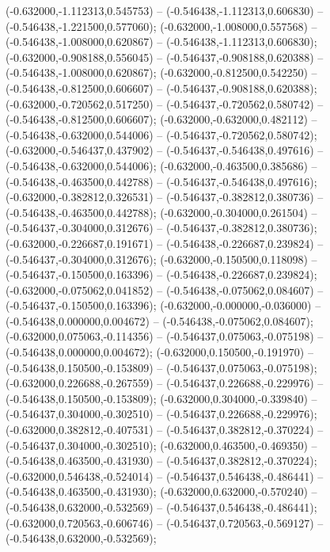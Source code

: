  (-0.632000,-1.112313,0.545753) -- (-0.546438,-1.112313,0.606830) -- (-0.546438,-1.221500,0.577060);
 (-0.632000,-1.008000,0.557568) -- (-0.546438,-1.008000,0.620867) -- (-0.546438,-1.112313,0.606830);
 (-0.632000,-0.908188,0.556045) -- (-0.546437,-0.908188,0.620388) -- (-0.546438,-1.008000,0.620867);
 (-0.632000,-0.812500,0.542250) -- (-0.546438,-0.812500,0.606607) -- (-0.546437,-0.908188,0.620388);
 (-0.632000,-0.720562,0.517250) -- (-0.546437,-0.720562,0.580742) -- (-0.546438,-0.812500,0.606607);
 (-0.632000,-0.632000,0.482112) -- (-0.546438,-0.632000,0.544006) -- (-0.546437,-0.720562,0.580742);
 (-0.632000,-0.546437,0.437902) -- (-0.546437,-0.546438,0.497616) -- (-0.546438,-0.632000,0.544006);
 (-0.632000,-0.463500,0.385686) -- (-0.546438,-0.463500,0.442788) -- (-0.546437,-0.546438,0.497616);
 (-0.632000,-0.382812,0.326531) -- (-0.546437,-0.382812,0.380736) -- (-0.546438,-0.463500,0.442788);
 (-0.632000,-0.304000,0.261504) -- (-0.546437,-0.304000,0.312676) -- (-0.546437,-0.382812,0.380736);
 (-0.632000,-0.226687,0.191671) -- (-0.546438,-0.226687,0.239824) -- (-0.546437,-0.304000,0.312676);
 (-0.632000,-0.150500,0.118098) -- (-0.546437,-0.150500,0.163396) -- (-0.546438,-0.226687,0.239824);
 (-0.632000,-0.075062,0.041852) -- (-0.546438,-0.075062,0.084607) -- (-0.546437,-0.150500,0.163396);
 (-0.632000,-0.000000,-0.036000) -- (-0.546438,0.000000,0.004672) -- (-0.546438,-0.075062,0.084607);
 (-0.632000,0.075063,-0.114356) -- (-0.546437,0.075063,-0.075198) -- (-0.546438,0.000000,0.004672);
 (-0.632000,0.150500,-0.191970) -- (-0.546438,0.150500,-0.153809) -- (-0.546437,0.075063,-0.075198);
 (-0.632000,0.226688,-0.267559) -- (-0.546437,0.226688,-0.229976) -- (-0.546438,0.150500,-0.153809);
 (-0.632000,0.304000,-0.339840) -- (-0.546437,0.304000,-0.302510) -- (-0.546437,0.226688,-0.229976);
 (-0.632000,0.382812,-0.407531) -- (-0.546437,0.382812,-0.370224) -- (-0.546437,0.304000,-0.302510);
 (-0.632000,0.463500,-0.469350) -- (-0.546438,0.463500,-0.431930) -- (-0.546437,0.382812,-0.370224);
 (-0.632000,0.546438,-0.524014) -- (-0.546437,0.546438,-0.486441) -- (-0.546438,0.463500,-0.431930);
 (-0.632000,0.632000,-0.570240) -- (-0.546438,0.632000,-0.532569) -- (-0.546437,0.546438,-0.486441);
 (-0.632000,0.720563,-0.606746) -- (-0.546437,0.720563,-0.569127) -- (-0.546438,0.632000,-0.532569);
